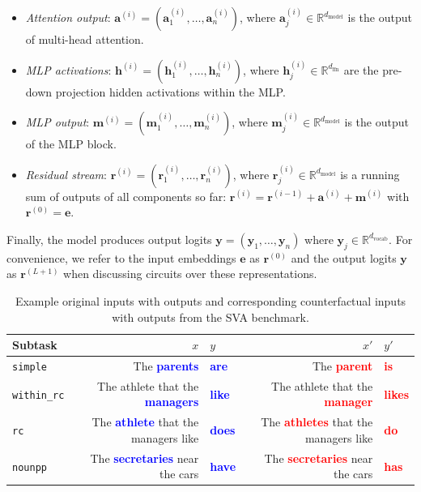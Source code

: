 \documentclass{article}
\theoremstyle{plain}
\theoremstyle{definition}
\theoremstyle{remark}
\begin{document}
\begin{itemize}
    \item \textit{Attention output}: $\mathbf{a}^{(i)} = (\mathbf{a}^{(i)}_1, \ldots, \mathbf{a}^{(i)}_n)$, where $\mathbf{a}^{(i)}_j \in \mathbb{R}^{d_\text{model}}$ is the output of multi-head attention.
    \item \textit{MLP activations}: $\mathbf{h}^{(i)} = (\mathbf{h}^{(i)}_1, \ldots, \mathbf{h}^{(i)}_n)$, where $\mathbf{h}^{(i)}_j \in \mathbb{R}^{d_\text{ffn}}$ are the pre-down projection hidden activations within the MLP.
    \item \textit{MLP output}: $\mathbf{m}^{(i)} = (\mathbf{m}^{(i)}_1, \ldots, \mathbf{m}^{(i)}_n)$, where $\mathbf{m}^{(i)}_j \in \mathbb{R}^{d_\text{model}}$ is the output of the MLP block.
    \item \textit{Residual stream}: $\mathbf{r}^{(i)} = (\mathbf{r}^{(i)}_1, \ldots, \mathbf{r}^{(i)}_n)$, where $\mathbf{r}^{(i)}_j \in \mathbb{R}^{d_\text{model}}$ is a running sum of outputs of all components so far: $\mathbf{r}^{(i)} = \mathbf{r}^{(i-1)} + \mathbf{a}^{(i)} + \mathbf{m}^{(i)}$ with $\mathbf{r}^{(0)} = \mathbf{e}$.
\end{itemize}

Finally, the model produces output logits $\mathbf{y} = (\mathbf{y}_1, \ldots, \mathbf{y}_n)$ where $\mathbf{y}_j \in \mathbb{R}^{d_\text{vocab}}$. For convenience, we refer to the input embeddings $\mathbf{e}$ as $\mathbf{r}^{(0)}$ and the output logits $\mathbf{y}$ as $\mathbf{r}^{(L + 1)}$ when discussing circuits over these representations.

\begin{table}[!t]
\centering
\small
\caption{Example original inputs with outputs and corresponding counterfactual inputs with outputs from the SVA benchmark.}
\begin{tabular}{lrlrl}
\toprule
\textbf{Subtask} & \textbf{$x$} & \textbf{$y$} & \textbf{$x'$} & \textbf{$y'$} \\
\midrule
\texttt{simple} & The \textcolor{blue}{\textbf{parents}} & \textcolor{blue}{\textbf{are}} & The \textcolor{red}{\textbf{parent}} & \textcolor{red}{\textbf{is}} \\
\texttt{within\_rc} & The athlete that the \textcolor{blue}{\textbf{managers}} & \textcolor{blue}{\textbf{like}} & The athlete that the \textcolor{red}{\textbf{manager}} & \textcolor{red}{\textbf{likes}} \\
\texttt{rc} & The \textcolor{blue}{\textbf{athlete}} that the managers like & \textcolor{blue}{\textbf{does}} & The \textcolor{red}{\textbf{athletes}} that the managers like & \textcolor{red}{\textbf{do}} \\
\texttt{nounpp} & The \textcolor{blue}{\textbf{secretaries}} near the cars & \textcolor{blue}{\textbf{have}} & The \textcolor{red}{\textbf{secretaries}} near the cars & \textcolor{red}{\textbf{has}} \\
\bottomrule
\end{tabular}
\label{tab:sva_examples}
\end{table}
\end{document}
